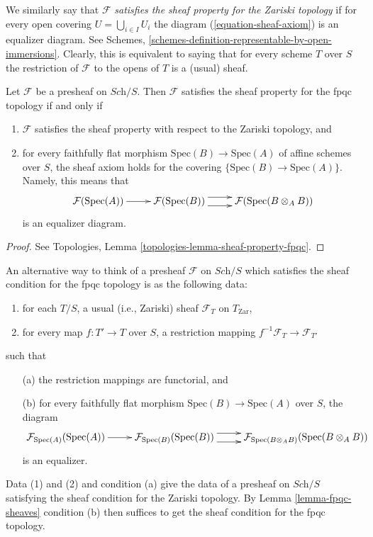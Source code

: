 \noindent
We similarly say that $\mathcal{F}$
{\it satisfies the sheaf property for the Zariski topology} if for
every open covering $U = \bigcup_{i \in I} U_i$ the diagram
(\ref{equation-sheaf-axiom}) is an equalizer diagram. See
Schemes, \ref{schemes-definition-representable-by-open-immersions}.
Clearly, this is equivalent to saying that for every scheme $T$ over $S$ the
restriction of $\mathcal{F}$ to the opens of $T$ is a (usual) sheaf.

\begin{lemma}
\label{lemma-fpqc-sheaves}
Let $\mathcal{F}$ be a presheaf on $\textit{Sch}/S$. Then
$\mathcal{F}$ satisfies the sheaf property for the fpqc topology
if and only if
\begin{enumerate}
\item $\mathcal{F}$ satisfies the sheaf property with respect to the
Zariski topology, and
\item for every faithfully flat morphism $\text{Spec}(B) \to \text{Spec}(A)$
of affine schemes over $S$, the sheaf axiom holds for the covering
$\{\text{Spec}(B) \to \text{Spec}(A)\}$. Namely, this means that
$$
\xymatrix{
\mathcal{F}(\text{Spec}(A)) \ar[r] &
\mathcal{F}(\text{Spec}(B)) \ar@<1ex>[r] \ar@<-1ex>[r] &
\mathcal{F}(\text{Spec}(B \otimes_A B))
}
$$
is an equalizer diagram.
\end{enumerate}
\end{lemma}

\begin{proof}
See Topologies, Lemma \ref{topologies-lemma-sheaf-property-fpqc}.
\end{proof}

\noindent
An alternative way to think of a presheaf $\mathcal{F}$ on
$\textit{Sch}/S$ which satisfies the sheaf condition for the
fpqc topology is as the following data:
\begin{enumerate}
\item for each $T/S$, a usual (i.e., Zariski) sheaf $\mathcal{F}_T$ on
$T_{\mathrm{Zar}}$,
\item for every map $f : T' \to T$ over $S$, a restriction mapping
$f^{-1}\mathcal{F}_T \to \mathcal{F}_{T'} $
\end{enumerate}
such that
\begin{enumerate}
\item[(a)] the restriction mappings are functorial, and
\item[(b)] for every faithfully flat morphism
$\text{Spec}(B) \to \text{Spec}(A)$ over $S$, the diagram
$$
\xymatrix{
\mathcal{F}_{\text{Spec}(A)}(\text{Spec}(A)) \ar[r] &
\mathcal{F}_{\text{Spec}(B)}(\text{Spec}(B)) \ar@<1ex>[r] \ar@<-1ex>[r] &
\mathcal{F}_{\text{Spec}(B \otimes_A B)}(\text{Spec}(B \otimes_A B))
}
$$
is an equalizer.
\end{enumerate}
Data (1) and (2) and condition (a) give the data of a presheaf
on $\textit{Sch}/S$ satisfying the sheaf condition for the Zariski topology.
By Lemma \ref{lemma-fpqc-sheaves} condition (b) then suffices to get the
sheaf condition for the fpqc topology.


